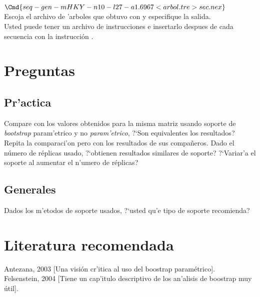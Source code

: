 \begin{math}
\Cmd{seq-gen -mHKY -n10 -l27 -a1.6967 <arbol.tre >sec.nex}
\end{math}\\ 

Escoja el archivo de 'arboles que obtuvo con  y especifique la salida.\\
Usted puede tener un archivo de instrucciones e insertarlo despues de cada secuencia con la instrucci\'on .
\section{Preguntas}
\subsection{Pr'actica}
\noindent
Compare con los valores obtenidos para la misma matriz usando soporte de \textit{bootstrap} param'etrico y no \textit{param'etrico}, ?`Son equivalentes los resultados?\\
Repita la comparaci'on pero con los resultados de sus compa\~neros. Dado el n\'umero de r\'eplicas usado, ?`obtienen resultados similares de soporte? ?`Variar'a el soporte al aumentar el n'umero de r\'eplicas?
\subsection{Generales}
\noindent
Dados los m'etodos de soporte usados, ?`usted qu'e tipo de soporte recomienda?
\section{Literatura recomendada}
\noindent
Antezana, 2003 [Una visi\'on cr'itica al uso del boostrap param\'etrico].\\
Felsenstein, 2004 [Tiene un cap'itulo descriptivo de los an'alisis de boostrap muy \'util].
